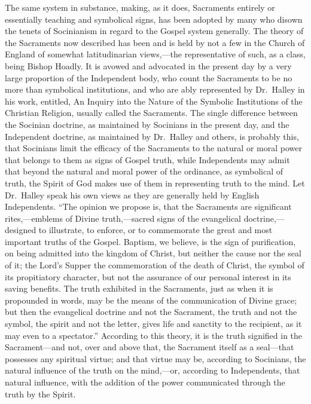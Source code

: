 \documentclass[]{book}
\begin{document}
The same system in substance, making, as it does, Sacraments entirely or essentially teaching and symbolical signs, has been adopted by many who disown the tenets of Socinianism in regard to the Gospel system generally. The theory of the Sacraments now described has been and is held by not a few in the Church of England of somewhat latitudinarian views,---the representative of such, as a class, being Bishop Hoadly. It is avowed and advocated in the present day by a very large proportion of the Independent body, who count the Sacraments to be no more than symbolical institutions, and who are ably represented by Dr.~Halley in his work, entitled, An Inquiry into the Nature of the Symbolic Institutions of the Christian Religion, usually called the Sacraments. The single difference between the Socinian doctrine, as maintained by Socinians in the present day, and the Independent doctrine, as maintained by Dr.~Halley and others, is probably this, that Socinians limit the efficacy of the Sacraments to the natural or moral power that belongs to them as signs of Gospel truth, while Independents may admit that beyond the natural and moral power of the ordinance, as symbolical of truth, the Spirit of God makes use of them in representing truth to the mind. Let Dr.~Halley speak his own views as they are generally held by English Independents. ``The opinion we propose is, that the Sacraments are significant rites,---emblems of Divine truth,---sacred signs of the evangelical doctrine,---designed to illustrate, to enforce, or to commemorate the great and most important truths of the Gospel. Baptism, we believe, is the sign of purification, on being admitted into the kingdom of Christ, but neither the cause nor the seal of it; the Lord's Supper the commemoration of the death of Christ, the symbol of its propitiatory character, but not the assurance of our personal interest in its saving benefits. The truth exhibited in the Sacraments, just as when it is propounded in words, may be the means of the communication of Divine grace; but then the evangelical doctrine and not the Sacrament, the truth and not the symbol, the spirit and not the letter, gives life and sanctity to the recipient, as it may even to a spectator.'' According to this theory, it is the truth signified in the Sacrament---and not, over and above that, the Sacrament itself as a seal---that possesses any spiritual virtue; and that virtue may be, according to Socinians, the natural influence of the truth on the mind,---or, according to Independents, that natural influence, with the addition of the power communicated through the truth by the Spirit.
\end{document}

